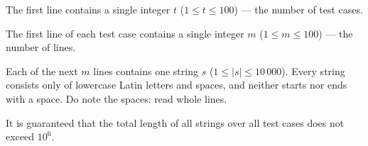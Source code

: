 The first line contains a single integer $t$ ($1 \le t \le 100$) --- the number of test cases.

The first line of each test case contains a single integer $m$ ($1 \le m \le 100$) --- the number of lines.

Each of the next $m$ lines contains one string $s$ ($1 \le |s| \le 10\,000$). Every string consists only of lowercase Latin letters and spaces, and neither starts nor ends with a space. Do note the spaces: read whole lines.

It is guaranteed that the total length of all strings over all test cases does not exceed $10^6$.
